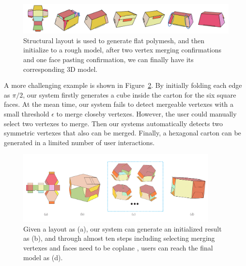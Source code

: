 \begin{figure}
	\centering
	\includegraphics[width=\textwidth]{images/105}
	\caption{Structural layout is used to generate flat polymesh, and then initialize to a rough model, after two vertex merging confirmations and one face pasting confirmation, we can finally have its corresponding 3D model.}
	\label{fig:result}
\end{figure}
%
A more challenging example is shown in Figure~\ref{fig:hexagon}. 
By initially folding each edge as $\pi/2$, our system firstly generates a cube inside the carton for the six square faces. 
At the mean time, our system fails to detect mergeable vertexes with a small threshold $\epsilon$ to merge closeby vertexes.
%
However, the user could manually select two vertexes to merge. Then our systems automatically detects two symmetric vertexes that also can be merged. 
%
Finally, a hexagonal carton can be generated in a limited number of user interactions.



\begin{figure}
	\centering
	\includegraphics[width=0.9\textwidth]{images/limitation}
	\caption{Given a layout as (a), our system can generate an initialized result as (b), and through almost ten steps including selecting merging vertexes and faces need to be coplane , users can reach the final model as (d). }
	\label{fig:hexagon}
\end{figure}


